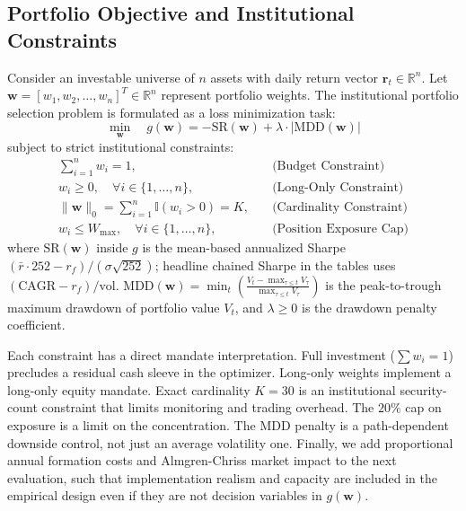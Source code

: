 \documentclass[11pt,a4paper]{article}
\begin{document}
\subsection{Portfolio Objective and Institutional Constraints}
\label{sec:formulation}
Consider an investable universe of $n$ assets with daily return vector $\mathbf{r}_t \in \mathbb{R}^n$. Let $\mathbf{w} = [w_1, w_2, \dots, w_n]^T \in \mathbb{R}^n$ represent portfolio weights. The institutional portfolio selection problem is formulated as a loss minimization task:
\begin{equation}
\min_{\mathbf{w}} \quad g(\mathbf{w}) = -\text{SR}(\mathbf{w}) + \lambda \cdot |\text{MDD}(\mathbf{w})|
\end{equation}
subject to strict institutional constraints:
\begin{align}
\sum_{i=1}^n w_i = 1, \quad & \text{(Budget Constraint)} \\
w_i \ge 0, \quad \forall i \in \{1, \dots, n\}, \quad & \text{(Long-Only Constraint)} \\
\|\mathbf{w}\|_0 = \sum_{i=1}^n \mathbb{I}(w_i > 0) = K, \quad & \text{(Cardinality Constraint)} \\
w_i \le W_{\max}, \quad \forall i \in \{1, \dots, n\}, \quad & \text{(Position Exposure Cap)}
\end{align}
where $\text{SR}(\mathbf{w})$ inside $g$ is the mean-based annualized Sharpe $(\bar r\cdot 252-r_f)/(\sigma\sqrt{252})$; headline chained Sharpe in the tables uses $(\mathrm{CAGR}-r_f)/\mathrm{vol}$. $\text{MDD}(\mathbf{w}) = \min_{t} \left( \frac{V_t - \max_{\tau \le t} V_\tau}{\max_{\tau \le t} V_\tau} \right)$ is the peak-to-trough maximum drawdown of portfolio value $V_t$, and $\lambda \ge 0$ is the drawdown penalty coefficient.

Each constraint has a direct mandate interpretation. Full investment ($\sum w_i = 1$) precludes a residual cash sleeve in the optimizer. Long-only weights implement a long-only equity mandate. Exact cardinality $K=30$ is an institutional security-count constraint that limits monitoring and trading overhead. The $20\%$ cap on exposure is a limit on the concentration. The MDD penalty is a path-dependent downside control, not just an average volatility one. Finally, we add proportional annual formation costs and Almgren-Chriss market impact to the next evaluation, such that implementation realism and capacity are included in the empirical design even if they are not decision variables in $g(\mathbf{w})$.
\end{document}
